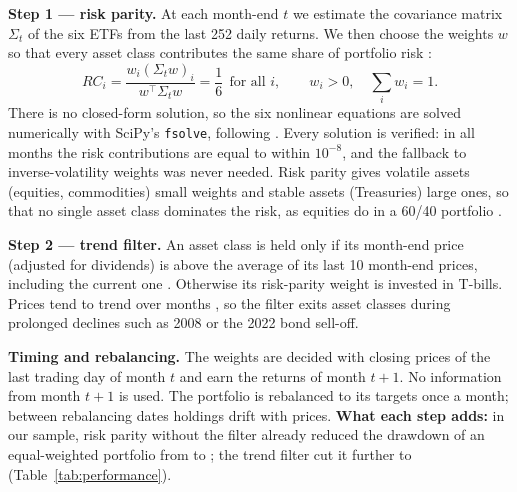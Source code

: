 \textbf{Step 1 --- risk parity.} At each month-end $t$ we estimate the covariance matrix $\Sigma_t$ of the six ETFs from
the last 252 daily returns. We then choose the weights $w$ so that every asset class contributes the same share of
portfolio risk \citep{maillard2010}:
\[
RC_i=\frac{w_i(\Sigma_t w)_i}{w^\top\Sigma_t w}=\frac{1}{6}\ \ \text{for all } i,\qquad w_i>0,\quad \textstyle\sum_i w_i=1 .
\]
There is no closed-form solution, so the six nonlinear equations are solved numerically with SciPy's \texttt{fsolve},
following \citet{spinu2013}. Every solution is verified: in all months the risk contributions are equal to within $10^{-8}$,
and the fallback to inverse-volatility weights was never needed. Risk parity gives volatile assets (equities, commodities)
small weights and stable assets (Treasuries) large ones, so that no single asset class dominates the risk, as equities
do in a 60/40 portfolio \citep{asness2012}.

\textbf{Step 2 --- trend filter.} An asset class is held only if its month-end price (adjusted for dividends) is above the average of
its last 10 month-end prices, including the current one \citep{faber2007}. Otherwise its risk-parity weight is invested in T-bills. Prices tend to trend over months
\citep{moskowitz2012}, so the filter exits asset classes during prolonged declines such as 2008 or the 2022 bond sell-off.

\textbf{Timing and rebalancing.} The weights are decided with closing prices of the last trading day of month $t$ and earn
the returns of month $t+1$. No information from month $t+1$ is used. The portfolio is rebalanced to its targets once a month;
between rebalancing dates holdings drift with prices. \textbf{What each step adds:} in our sample, risk
parity without the filter already reduced the drawdown of an equal-weighted portfolio from  to
; the trend filter cut it further to  (Table~\ref{tab:performance}).
